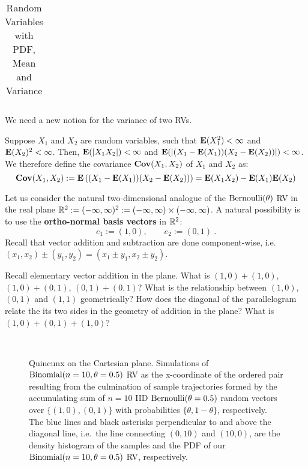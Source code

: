 \begin{table}[ht]
\begin{tabular}{|c|c|c|c|}
\hline
\end{tabular}
\caption{Random Variables with PDF, Mean and Variance}
\end{table}


We need a new notion for the variance of two RVs.
\begin{definition}[Covariance]
Suppose $X_1$ and $X_2$ are random variables, such that $\mathbf{E}(X_1^2) < \infty$ and $\mathbf{E}(X_2)^2 < \infty$.  Then, $\mathbf{E}(|X_1 X_2|) < \infty$ and $\mathbf{E}(|(X_1-\mathbf{E}(X_1))(X_2-\mathbf{E}(X_2))|) < \infty$.  We therefore define the covariance $\mathbf{Cov}(X_1,X_2)$ of $X_1$ and $X_2$ as:
\[
\mathbf{Cov}(X_1,X_2) := \mathbf{E} \left((X_1-\mathbf{E}(X_1))(X_2-\mathbf{E}(X_2))\right) = \mathbf{E}(X_1 X_2) - \mathbf{E}(X_1) \mathbf{E}(X_2)
\]
\end{definition}

Let us consider the natural two-dimensional analogue of the $\mbox{{\rm Bernoulli}}(\theta)$ RV in the real plane $\mathbb{R}^2 := (-\infty,\infty)^2 := (-\infty,\infty) \times (-\infty,\infty)$.  A natural possibility is to use the {\bf ortho-normal basis vectors} in $\mathbb{R}^2$:
$$ \boxed{
e_1 := (1,0), \qquad e_2 := (0,1)
} \ .$$
Recall that vector addition and subtraction are done component-wise, i.e.~$(x_1,x_2) \pm (y_1,y_2) = (x_1\pm y_1,x_2 \pm y_2)$.

\begin{classwork}
Recall elementary vector addition in the plane.  What is $(1,0)+(1,0)$, $(1,0)+(0,1)$, $(0,1)+(0,1)$?  What is the relationship between $(1,0)$, $(0,1)$ and $(1,1)$ geometrically? How does the diagonal of the parallelogram relate the its two sides in the geometry of addition in the plane?  What is  $(1,0)+(0,1)+(1,0)$?
\end{classwork}

\begin{figure}[htpb]
\caption{Quincunx on the Cartesian plane.  Simulations of $\mbox{{\rm Binomial}}(n=10,\theta=0.5)$ RV as the x-coordinate of the ordered pair resulting from the culmination of sample trajectories formed by the accumulating sum of $n=10$ IID $\mbox{{\rm Bernoulli}}(\theta=0.5)$ random vectors over $\{(1,0),(0,1)\}$ with probabilities $\{\theta,1-\theta\}$, respectively.  The blue lines and black asterisks perpendicular to and above the diagonal line, i.e.~the line connecting $(0,10)$ and $(10,0)$, are the density histogram of the samples and the PDF of our $\mbox{{\rm Binomial}}(n=10,\theta=0.5)$ RV, respectively.\label{F:BinomQuincunxn10r10r1000}}
\centering
\mbox{ \hspace{-2cm}
	    }
\end{figure}


